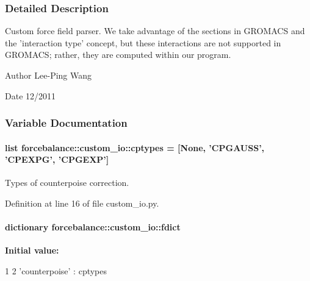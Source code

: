\subsubsection{\-Detailed \-Description}
\-Custom force field parser. \-We take advantage of the sections in \-G\-R\-O\-M\-A\-C\-S and the 'interaction type' concept, but these interactions are not supported in \-G\-R\-O\-M\-A\-C\-S; rather, they are computed within our program.

\begin{DoxyAuthor}{\-Author}
\-Lee-\/\-Ping \-Wang 
\end{DoxyAuthor}
\begin{DoxyDate}{\-Date}
12/2011 
\end{DoxyDate}


\subsubsection{\-Variable \-Documentation}
\hypertarget{namespaceforcebalance_1_1custom__io_a509d4c2b5eeee4278adde414e55eb560}{
\paragraph[{cptypes}]{\setlength{\rightskip}{0pt plus 5cm}list {\bf forcebalance\-::custom\-\_\-io\-::cptypes} = \mbox{[}\-None, '\-C\-P\-G\-A\-U\-S\-S', '\-C\-P\-E\-X\-P\-G', '\-C\-P\-G\-E\-X\-P'\mbox{]}}}\label{namespaceforcebalance_1_1custom__io_a509d4c2b5eeee4278adde414e55eb560}


\-Types of counterpoise correction. 



\-Definition at line 16 of file custom\-\_\-io.\-py.

\hypertarget{namespaceforcebalance_1_1custom__io_a64c7f292c64ad2b2b855a82e68c0ca7e}{
\paragraph[{fdict}]{\setlength{\rightskip}{0pt plus 5cm}dictionary {\bf forcebalance\-::custom\-\_\-io\-::fdict}}}\label{namespaceforcebalance_1_1custom__io_a64c7f292c64ad2b2b855a82e68c0ca7e}
{\bfseries \-Initial value\-:}
\begin{DoxyCode}
1 {
2     'counterpoise'  : cptypes    }
\end{DoxyCode}


